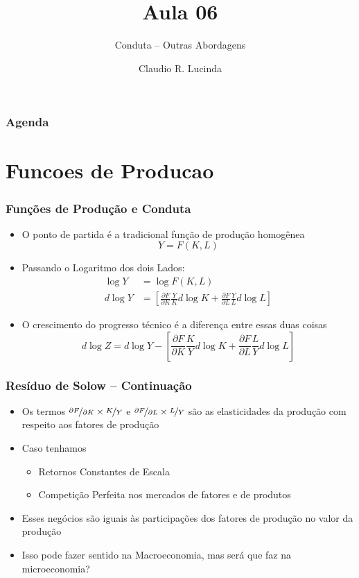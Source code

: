 \documentclass{beamer}
\title{Aula 06}
\subtitle{Conduta -- Outras Abordagens}
\author{Claudio R. Lucinda}
\institute{FEA-RP/USP}
\date{}
\begin{document}
\frame{\titlepage}
\begin{frame}\frametitle{Agenda}
  \tableofcontents[pausesections]
\end{frame}

\section{Funcoes de Producao}
\begin{frame}[fragile]\frametitle{Funções de Produção e Conduta}
    \begin{itemize}
        \item O ponto de partida é a tradicional função de produção homogênea
        \begin{equation*}
            Y=F(K,L)
        \end{equation*}
        \item Passando o Logaritmo dos dois Lados:
        \begin{align*}
            \log{Y}&=\log{F(K,L)}  \\
            d\log{Y}&=\left [\frac{\partial F}{\partial K}\frac{Y}{K}d\log{K} + \frac{\partial F}{\partial L}\frac{Y}{L} d\log{L} \right]
        \end{align*}
        \item O crescimento do progresso técnico é a diferença entre essas duas coisas
        \begin{equation}
            d\log{Z}=d\log{Y}-\left [\frac{\partial F}{\partial K}\frac{K}{Y}d\log{K} + \frac{\partial F}{\partial L}\frac{L}{Y} d\log{L} \right]
        \end{equation}
    \end{itemize}
    

\end{frame}
\begin{frame}[fragile]\frametitle{Resíduo de Solow -- Continuação}
    \begin{itemize}
        \item Os termos $\nicefrac{\partial F}{\partial K} \times \nicefrac{K}{Y}$ e $\nicefrac{\partial F}{\partial L} \times \nicefrac{L}{Y}$ são as elasticidades da produção com respeito aos fatores de produção
        \item Caso tenhamos
        \begin{itemize}
            \item Retornos Constantes de Escala
            \item Competição Perfeita nos mercados de fatores e de produtos
        \end{itemize}
        \item Esses negócios são iguais às participações dos fatores de produção no valor da produção
        \item Isso pode fazer sentido na Macroeconomia, mas será que faz na microeconomia?
    \end{itemize}


\end{frame}
\end{document}
